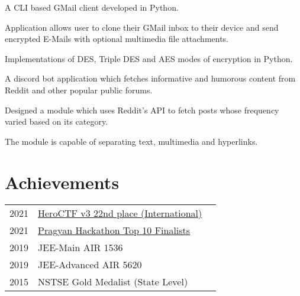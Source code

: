 \documentclass[]{deedy-resume-openfont}
\begin{document}
\begin{minipage}[t]{0.66\textwidth}
\begin{tightemize}
\item A CLI based GMail client developed in Python.
\item Application allows user to clone their GMail inbox to their device and send encrypted E-Mails with optional multimedia file attachments.
\end{tightemize}
\sectionsep

\begin{tightemize}
\item Implementations of DES, Triple DES and AES modes of encryption in Python.
\end{tightemize}
\sectionsep

\begin{tightemize}
\item A discord bot application which fetches informative and humorous content from Reddit and other popular public forums.
\item Designed a module which uses Reddit's API to fetch posts whose frequency varied based on its category.
\item The module is capable of separating text, multimedia and hyperlinks.
\end{tightemize}
\sectionsep


\section{Achievements} 
\begin{tabular}{rll}
2021         & \href{https://ctftime.org/team/152408}{HeroCTF v3 22nd place (International)} \\
2021         & \href{https://drive.google.com/file/d/1aiflQoKb40RCsMEdPTRNMOQusCE2PLIn/view?usp=sharing}{Pragyan Hackathon Top 10 Finalists} \\
2019	     & JEE-Main AIR 1536 \\
2019	     & JEE-Advanced AIR 5620 \\
2015	     & NSTSE Gold Medalist (State Level)\\
\end{tabular}
\sectionsep

\end{minipage} 
\end{document}
